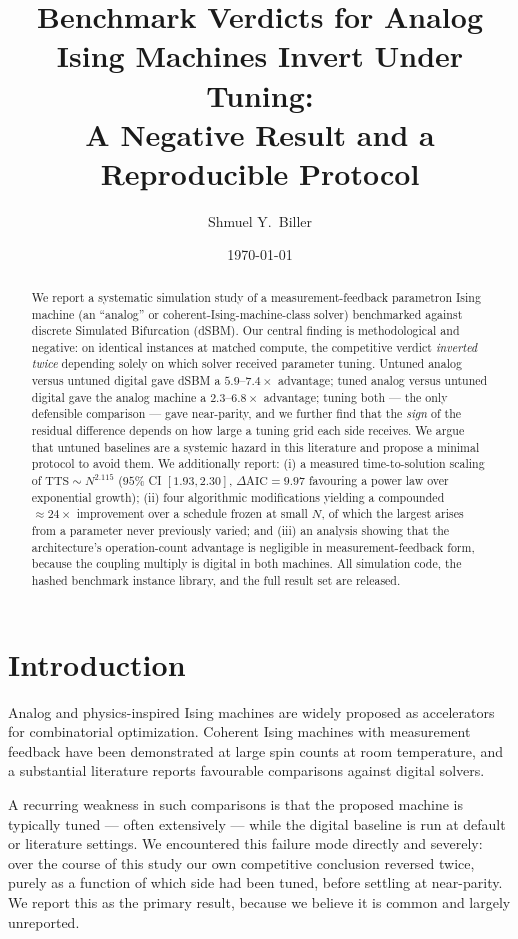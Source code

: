\documentclass[11pt]{article}
\title{Benchmark Verdicts for Analog Ising Machines Invert Under Tuning:\\
A Negative Result and a Reproducible Protocol}
\author[1]{Shmuel Y.\ Biller}
\affil[1]{Independent researcher}
\date{\today}
\begin{document}
\maketitle

\begin{abstract}
We report a systematic simulation study of a measurement-feedback parametron
Ising machine (an ``analog'' or coherent-Ising-machine-class solver) benchmarked
against discrete Simulated Bifurcation (dSBM). Our central finding is
methodological and negative: on identical instances at matched compute, the
competitive verdict \emph{inverted twice} depending solely on which solver
received parameter tuning. Untuned analog versus untuned digital gave dSBM a
$5.9$--$7.4\times$ advantage; tuned analog versus untuned digital gave the
analog machine a $2.3$--$6.8\times$ advantage; tuning both --- the only
defensible comparison --- gave near-parity, and we further find that the
\emph{sign} of the residual difference depends on how large a tuning grid each
side receives. We argue that untuned baselines are a systemic hazard in
this literature and propose a minimal protocol to avoid them. We additionally
report: (i) a measured time-to-solution scaling of $\mathrm{TTS}\sim N^{2.115}$
($95\%$ CI $[1.93,2.30]$, $\Delta\mathrm{AIC}=9.97$ favouring a power law over
exponential growth); (ii) four algorithmic modifications yielding a compounded
$\approx\!24\times$ improvement over a schedule frozen at small $N$, of which the
largest arises from a parameter never previously varied; and (iii) an analysis
showing that the architecture's operation-count advantage is negligible in
measurement-feedback form, because the coupling multiply is digital in both
machines. All simulation code, the hashed benchmark instance library, and the
full result set are released.
\end{abstract}

\section{Introduction}

Analog and physics-inspired Ising machines are widely proposed as accelerators
for combinatorial optimization. Coherent Ising machines with measurement
feedback have been demonstrated at large spin counts at room temperature, and a
substantial literature reports favourable comparisons against digital solvers.

A recurring weakness in such comparisons is that the proposed machine is
typically tuned --- often extensively --- while the digital baseline is run at
default or literature settings. We encountered this failure mode directly and
severely: over the course of this study our own competitive conclusion reversed
twice, purely as a function of which side had been tuned, before settling at
near-parity. We report this as the primary result, because we believe it is
common and largely unreported.
\end{document}
